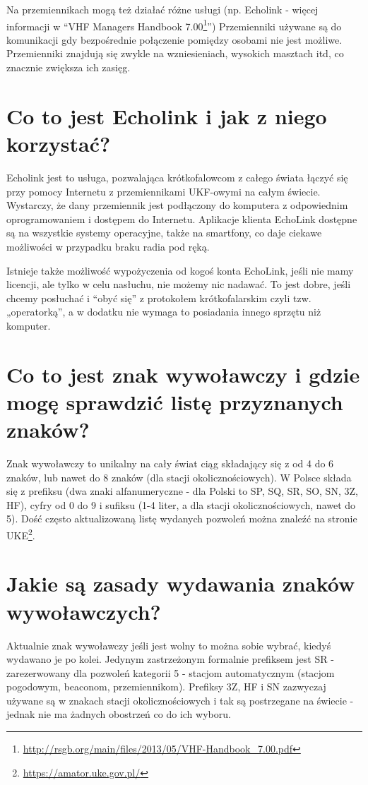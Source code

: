 \documentclass[a4paper,12pt]{article}
\begin{document}
Na przemiennikach mogą też działać różne usługi (np. Echolink - więcej informacji w “VHF Managers Handbook 7.00\footnote{\url{http://rsgb.org/main/files/2013/05/VHF-Handbook_7.00.pdf}}”) Przemienniki używane są do komunikacji gdy bezpośrednie połączenie pomiędzy osobami nie jest możliwe. Przemienniki znajdują się zwykle na wzniesieniach, wysokich masztach itd, co znacznie zwiększa ich zasięg.

\section{Co to jest Echolink i jak z niego korzystać?}
Echolink jest to usługa, pozwalająca krótkofalowcom z całego świata łączyć się przy pomocy Internetu z przemiennikami UKF-owymi na całym świecie. Wystarczy, że dany przemiennik jest podłączony do komputera z odpowiednim oprogramowaniem i dostępem do Internetu.
Aplikacje klienta EchoLink dostępne są na wszystkie systemy operacyjne, także na smartfony, co daje ciekawe możliwości w przypadku braku radia pod ręką.

Istnieje także możliwość wypożyczenia od kogoś konta EchoLink, jeśli nie mamy licencji, ale tylko w celu nasłuchu, nie możemy nic nadawać. To jest dobre, jeśli chcemy posłuchać i “obyć się” z protokołem krótkofalarskim czyli tzw. „operatorką”, a w dodatku nie wymaga to posiadania innego sprzętu niż komputer.

\section{Co to jest znak wywoławczy i gdzie mogę sprawdzić listę przyznanych znaków?}
Znak wywoławczy to unikalny na cały świat ciąg składający się z od 4 do 6 znaków, lub nawet do 8 znaków (dla stacji okolicznościowych). W Polsce składa się z prefiksu (dwa znaki alfanumeryczne - dla Polski to SP, SQ, SR, SO, SN, 3Z, HF), cyfry od 0 do 9 i sufiksu (1-4 liter, a dla stacji okolicznościowych, nawet do 5).
Dość często aktualizowaną listę wydanych pozwoleń można znaleźć na stronie UKE\footnote{\url{https://amator.uke.gov.pl/}}.


\section{Jakie są zasady wydawania znaków wywoławczych?}
Aktualnie znak wywoławczy jeśli jest wolny to można sobie wybrać, kiedyś wydawano je po kolei. Jedynym zastrzeżonym formalnie prefiksem jest SR - zarezerwowany dla pozwoleń kategorii 5 - stacjom automatycznym (stacjom pogodowym, beaconom, przemiennikom). Prefiksy 3Z, HF i SN zazwyczaj używane są w znakach stacji okolicznościowych i tak są postrzegane na świecie - jednak nie ma żadnych obostrzeń co do ich wyboru.
\end{document}
